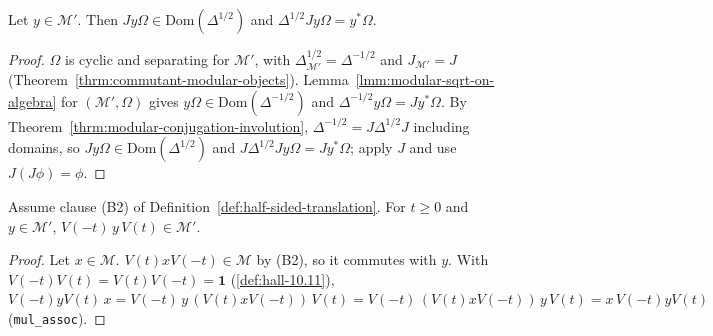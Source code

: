 \begin{lemma}[$\Delta^{1/2}Jy\Omega = y^*\Omega$ for $y \in \mathcal{M}'$]
    \label{lmm:commutant-vector-modular-sqrt}
    \leanok
    Let $y \in \mathcal{M}'$. Then $Jy\Omega \in \text{Dom}(\Delta^{1/2})$ and $\Delta^{1/2}Jy\Omega = y^*\Omega$.
\end{lemma}
\begin{proof}
    \leanok
    $\Omega$ is cyclic and separating for $\mathcal{M}'$, with $\Delta_{\mathcal{M}'}^{1/2} = \Delta^{-1/2}$ and $J_{\mathcal{M}'} = J$ (Theorem~\ref{thrm:commutant-modular-objects}). Lemma~\ref{lmm:modular-sqrt-on-algebra} for $(\mathcal{M}', \Omega)$ gives $y\Omega \in \text{Dom}(\Delta^{-1/2})$ and $\Delta^{-1/2}y\Omega = Jy^*\Omega$. By Theorem~\ref{thrm:modular-conjugation-involution}, $\Delta^{-1/2} = J\Delta^{1/2}J$ including domains, so $Jy\Omega \in \text{Dom}(\Delta^{1/2})$ and $J\Delta^{1/2}Jy\Omega = Jy^*\Omega$; apply $J$ and use $J(J\phi) = \phi$.
\end{proof}

\begin{lemma}
    \label{lmm:commutant-reverse-endomorphism}
    \leanok
    Assume clause (B2) of Definition~\ref{def:half-sided-translation}. For $t \ge 0$ and $y \in \mathcal{M}'$, $V(-t)\,y\,V(t) \in \mathcal{M}'$.
\end{lemma}
\begin{proof}
    \leanok
    Let $x \in \mathcal{M}$. $V(t)xV(-t) \in \mathcal{M}$ by (B2), so it commutes with $y$. With $V(-t)V(t) = V(t)V(-t) = \mathbf{1}$ (\ref{def:hall-10.11}), $V(-t)yV(t)\,x = V(-t)\,y\,(V(t)xV(-t))\,V(t) = V(-t)\,(V(t)xV(-t))\,y\,V(t) = x\,V(-t)yV(t)$ (\texttt{mul\_assoc}).
\end{proof}


